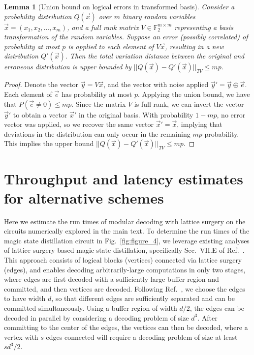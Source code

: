 \documentclass[prx,twocolumn,secnumarabic,balancelastpage,amsmath,amssymb,longbibliography]{revtex4-2}
\newtheorem{lemma}[thm]{Lemma}
\newcommand{\nmeas}{m}
\begin{document}
\begin{lemma}[Union bound on logical errors in transformed basis]
\label{lemma:union}
Consider a probability distribution $Q(\vec{x})$ over $\nmeas$ binary random variables $\vec{x}=(x_1,x_2,...,x_\nmeas)$, and a full rank matrix $V\in \mathbb{F}_2^{\nmeas\times\nmeas}$ representing a basis transformation of the random variables.
%
Suppose an error (possibly correlated) of probability at most $p$ is applied to each element of $V\vec{x}$, resulting in a new distribution $Q'(\vec{x})$.
%
Then the total variation distance between the original and erroneous distribution is upper bounded by $||Q(\vec{x})-Q'(\vec{x})||_{TV}\leq \nmeas p$.
\end{lemma}

\begin{proof}
Denote the vector $\vec{y}=V\vec{x}$, and the vector with noise applied $\vec{y}'=\vec{y}\oplus \vec{e}$.
%
Each element of $\vec{e}$ has probability at most $p$.
%
Applying the union bound, we have that $P(\vec{e}\neq 0)\leq mp$.
%
Since the matrix $V$ is full rank, we can invert the vector $\vec{y}'$ to obtain a vector $\vec{x}'$ in the original basis.
%
With probability $1-\nmeas p$, no error vector was applied, so we recover the same vector $\vec{x}'=\vec{x}$, implying that deviations in the distribution can only occur in the remaining $\nmeas p$ probability.
%
This implies the upper bound $||Q(\vec{x})-Q'(\vec{x})||_{TV}\leq \nmeas p$.
\end{proof}

\section{Throughput and latency estimates for alternative schemes}
\label{appendix:surgery}
Here we estimate the run times of modular decoding with lattice surgery on the circuits numerically explored in the main text. 
%
To determine the run times of the magic state distillation circuit in Fig.~\ref{fig:figure_4}, we leverage existing analyses of lattice-surgery-based magic state distillation, specifically Sec.~VII.E of Ref.~\cite{bombin2023modular}.
%
This approach consists of logical blocks (vertices) connected via lattice surgery (edges), and enables decoding arbitrarily-large computations in only two stages, where edges are first decoded with a sufficiently large buffer region and committed, and then vertices are decoded.
%
Following Ref.~\cite{bombin2023modular}, we choose the edges to have width $d$, so that different edges are sufficiently separated and can be committed simultaneously.
%
Using a buffer region of width $d/2$, the edges can be decoded in parallel by considering a decoding problem of size $d^3$.
%
After committing to the center of the edges, the vertices can then be decoded, where a vertex with $s$ edges connected will require a decoding problem of size at least $sd^3/2$.
\end{document}
